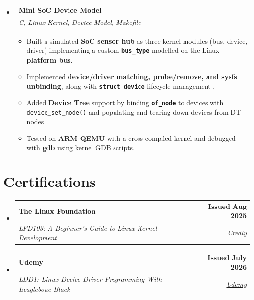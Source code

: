 \documentclass[letterpaper,11pt]{article}
\makeatletter
\newcommand{\resumeItem}[1]{
\item\small{
    {#1 \vspace{-2pt}}
  }
}
\newcommand{\resumeSubheading}[4]{
  \vspace{-2pt}
\item
  \begin{tabular*}{1.0\textwidth}[t]{l@{\extracolsep{\fill}}r}
    \textbf{#1} & \textbf{\small #2} \\
    \textit{\small#3} & \textit{\small #4} \\
  \end{tabular*}\vspace{-7pt}
}
\newcommand{\resumeSubHeadingListStart}{
\begin{itemize}[leftmargin=0.0in, label={}]}
\newcommand{\resumeSubHeadingListEnd}{
\end{itemize}}
\newcommand{\resumeItemListStart}{
\begin{itemize}}
\newcommand{\resumeItemListEnd}{
\end{itemize}\vspace{-5pt}}
\makeatother
\begin{document}
\resumeSubHeadingListStart
\vspace{-3pt}
\resumeSubheading
{Mini SoC Device Model}
{\href{https://github.com/ankitkhushwaha/mini-soc-device-model}{\faGithub}}
{C, Linux Kernel, Device Model, Makefile}{}
\vspace{-3pt}
\resumeItemListStart
\resumeItem{Built a simulated \textbf{SoC sensor hub} as three kernel modules (bus, device, driver) implementing a custom \textbf{\texttt{bus\_type}} modelled on the Linux \textbf{platform bus}.}
\resumeItem{Implemented \textbf{device/driver matching, probe/remove, and sysfs unbinding}, along with \textbf{\texttt{struct device}} lifecycle management .}
\resumeItem{Added \textbf{Device Tree} support by binding \textbf{\texttt{of\_node}} to devices with \texttt{device\_set\_node()} and populating and tearing down devices from DT nodes}
\resumeItem{Tested on \textbf{ARM QEMU} with a cross-compiled kernel and debugged with \textbf{gdb} using kernel GDB scripts.}\resumeItemListEnd
\vspace{-8pt}
\resumeSubHeadingListEnd


\section{Certifications}
\resumeSubHeadingListStart
\resumeSubheading
{The Linux Foundation}
{Issued Aug 2025}
{LFD103: A Beginner's Guide to Linux Kernel Development}
{\href{https://www.credly.com/badges/84d27b87-bf04-43fb-971b-6484b78cb651/public_url}{Credly}}
\vspace{-4pt}
\resumeSubheading
{Udemy}
{Issued July 2026}
{LDD1: Linux Device Driver Programming With Beaglebone Black}
{\href{https://www.udemy.com/certificate/UC-5013297e-6908-4e59-8aef-18bf2e4a293e/}{Udemy}}

\resumeSubHeadingListEnd
\end{document}
